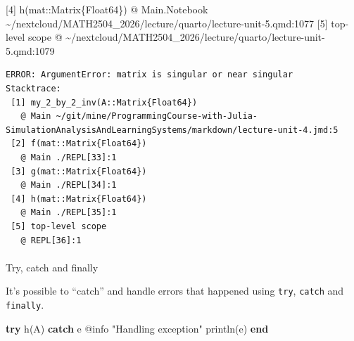 \documentclass[
]{article}
\makeatletter
\let\oldparagraph\paragraph
\renewcommand{\paragraph}{
    \@ifstar
      \xxxParagraphStar
      \xxxParagraphNoStar
  }
\newcommand{\xxxParagraphStar}[1]{\oldparagraph*{#1}\mbox{}}
\newcommand{\xxxParagraphNoStar}[1]{\oldparagraph{#1}\mbox{}}
\newenvironment{Shaded}{\begin{snugshade}}{\end{snugshade}}
\newcommand{\ConstantTok}[1]{\textcolor[rgb]{0.56,0.35,0.01}{#1}}
\newcommand{\ControlFlowTok}[1]{\textcolor[rgb]{0.00,0.23,0.31}{\textbf{#1}}}
\newcommand{\FunctionTok}[1]{\textcolor[rgb]{0.28,0.35,0.67}{#1}}
\newcommand{\NormalTok}[1]{\textcolor[rgb]{0.00,0.23,0.31}{#1}}
\newcommand{\PreprocessorTok}[1]{\textcolor[rgb]{0.68,0.00,0.00}{#1}}
\newcommand{\StringTok}[1]{\textcolor[rgb]{0.13,0.47,0.30}{#1}}
\makeatother
\begin{document}
\begin{Highlighting}
\textcolor{QuartoInternalColor1}{ [4] }\textcolor{QuartoInternalColor1}{}\textcolor{QuartoInternalColor1}{h}\textcolor{QuartoInternalColor1}{}\textcolor{QuartoInternalColor1}{}\textcolor{QuartoInternalColor1}{(}\textcolor{QuartoInternalColor1}{}\textcolor{QuartoInternalColor1}{mat}\textcolor{QuartoInternalColor1}{::}\textcolor{QuartoInternalColor1}{Matrix}\textcolor{QuartoInternalColor1}{\{Float64\}}\textcolor{QuartoInternalColor1}{}\textcolor{QuartoInternalColor1}{}\textcolor{QuartoInternalColor1}{)}\textcolor{QuartoInternalColor1}{}
\textcolor{QuartoInternalColor1}{}\textcolor{QuartoInternalColor1}{   @}\textcolor{QuartoInternalColor1}{ }\textcolor{QuartoInternalColor2}{Main.Notebook}\textcolor{QuartoInternalColor1}{ }\textcolor{QuartoInternalColor1}{\textasciitilde{}/nextcloud/MATH2504\_2026/lecture/quarto/}\textcolor{QuartoInternalColor1}{}\textcolor{QuartoInternalColor1}{}\textcolor{QuartoInternalColor1}{lecture-unit-5.qmd:1077}\textcolor{QuartoInternalColor1}{}\textcolor{QuartoInternalColor1}{}
\textcolor{QuartoInternalColor1}{ [5] top-level scope}
\textcolor{QuartoInternalColor1}{}\textcolor{QuartoInternalColor1}{   @}\textcolor{QuartoInternalColor1}{ }\textcolor{QuartoInternalColor1}{\textasciitilde{}/nextcloud/MATH2504\_2026/lecture/quarto/}\textcolor{QuartoInternalColor1}{}\textcolor{QuartoInternalColor1}{}\textcolor{QuartoInternalColor1}{lecture-unit-5.qmd:1079}\textcolor{QuartoInternalColor1}{}\textcolor{QuartoInternalColor1}{}
\end{Highlighting}

\begin{verbatim}
ERROR: ArgumentError: matrix is singular or near singular
Stacktrace:
 [1] my_2_by_2_inv(A::Matrix{Float64})
   @ Main ~/git/mine/ProgrammingCourse-with-Julia-SimulationAnalysisAndLearningSystems/markdown/lecture-unit-4.jmd:5
 [2] f(mat::Matrix{Float64})
   @ Main ./REPL[33]:1
 [3] g(mat::Matrix{Float64})
   @ Main ./REPL[34]:1
 [4] h(mat::Matrix{Float64})
   @ Main ./REPL[35]:1
 [5] top-level scope
   @ REPL[36]:1
\end{verbatim}

\paragraph{Try, catch and finally}\label{try-catch-and-finally}

It's possible to ``catch'' and handle errors that happened using
\texttt{try}, \texttt{catch} and \texttt{finally}.

\begin{Shaded}
\begin{Highlighting}[]
\ControlFlowTok{try} 
   \FunctionTok{h}\NormalTok{(A)}
\ControlFlowTok{catch} \ConstantTok{e}
   \PreprocessorTok{@info} \StringTok{"Handling exception"} \FunctionTok{println}\NormalTok{(}\ConstantTok{e}\NormalTok{)}
\ControlFlowTok{end}
\end{Highlighting}
\end{Shaded}
\end{document}

